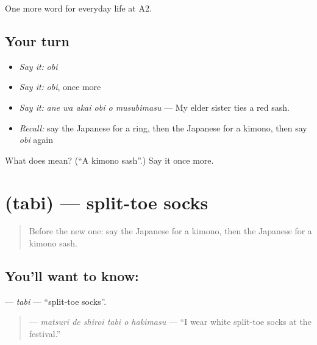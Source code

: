 \begin{grammarlens}[title={What you've built}]
One more word for everyday life at A2.
\end{grammarlens}

\subsection*{Your turn}
\begin{itemize}
\raggedright
  \item \emph{Say it:} \emph{obi}
  \item \emph{Say it:} \emph{obi}, once more
  \item \emph{Say it:} \emph{ane wa akai obi o musubimasu} — My elder sister ties a red sash.
  \item \emph{Recall:} say the Japanese for a ring, then the Japanese for a kimono, then say \emph{obi} again
\end{itemize}

\begin{tcolorbox}[breakable,colback=teal!4,colframe=teal!35!black,title={Before you move on}]
What does  mean? (\textquotedblleft{}A kimono sash\textquotedblright{}.) Say it once more.
\end{tcolorbox}
\section[\texorpdfstring{\ja{たび} (tabi)}{たび (tabi)}]{ (tabi) — split-toe socks}

\label{lesson:JA-C151-tabi}



\begin{quote}
Before the new one: say the Japanese for a kimono, then the Japanese for a kimono sash.
\end{quote}

\subsection*{You'll want to know: }
\textbf{} — \emph{tabi} — \textquotedblleft{}split-toe socks\textquotedblright{}.

\begin{quote}
\textbf{   } — \emph{matsuri de shiroi tabi o hakimasu} — \textquotedblleft{}I wear white split-toe socks at the festival.\textquotedblright{}
\end{quote}

